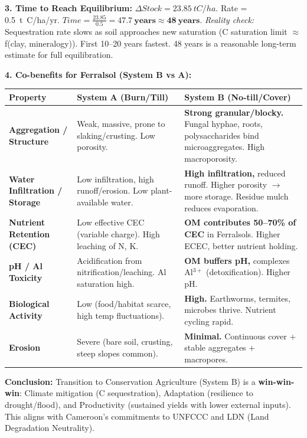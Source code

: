 \documentclass[11pt]{article}
\begin{document}
\begin{exoresolu}
\noindent\textbf{3. Time to Reach Equilibrium:}
$\Delta Stock = \SI{23.85}{t C/ha}$.
Rate = \SI{0.5}{t C/ha/yr}.
$Time = \frac{23.85}{0.5} = \mathbf{47.7\ years} \approx \mathbf{48\ years}$.
\textit{Reality check:} Sequestration rate slows as soil approaches new saturation (C saturation limit $\approx$ f(clay, mineralogy)). First 10--20 years fastest. 48 years is a reasonable long-term estimate for full equilibration.

\noindent\textbf{4. Co-benefits for Ferralsol (System B vs A):}
\begin{center}
\begin{tabularx}{\linewidth}{|l|X|X|}\hline
\rowcolor{popblueL}
\textbf{Property} & \textbf{System A (Burn/Till)} & \textbf{System B (No-till/Cover)} \\ \hline
\textbf{Aggregation / Structure} & Weak, massive, prone to slaking/crusting. Low porosity. & \textbf{Strong granular/blocky.} Fungal hyphae, roots, polysaccharides bind microaggregates. High macroporosity. \\ \hline
\textbf{Water Infiltration / Storage} & Low infiltration, high runoff/erosion. Low plant-available water. & \textbf{High infiltration,} reduced runoff. Higher porosity $\rightarrow$ more storage. Residue mulch reduces evaporation. \\ \hline
\textbf{Nutrient Retention (CEC)} & Low effective CEC (variable charge). High leaching of N, K. & \textbf{OM contributes 50--70\% of CEC} in Ferralsols. Higher ECEC, better nutrient holding. \\ \hline
\textbf{pH / Al Toxicity} & Acidification from nitrification/leaching. Al saturation high. & \textbf{OM buffers pH,} complexes Al$^{3+}$ (detoxification). Higher pH. \\ \hline
\textbf{Biological Activity} & Low (food/habitat scarce, high temp fluctuations). & \textbf{High.} Earthworms, termites, microbes thrive. Nutrient cycling rapid. \\ \hline
\textbf{Erosion} & Severe (bare soil, crusting, steep slopes common). & \textbf{Minimal.} Continuous cover + stable aggregates + macropores. \\ \hline
\end{tabularx}
\end{center}

\noindent\textbf{Conclusion:} Transition to Conservation Agriculture (System B) is a \textbf{win-win-win}: Climate mitigation (C sequestration), Adaptation (resilience to drought/flood), and Productivity (sustained yields with lower external inputs). This aligns with Cameroon's commitments to UNFCCC and LDN (Land Degradation Neutrality).
\end{exoresolu}
\end{document}

